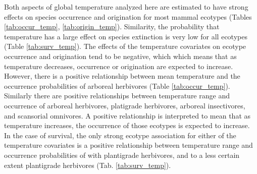 \documentclass[12pt,letterpaper]{article}
\begin{document}
Both aspects of global temperature analyzed here are estimated to have strong effects on species occurrence and origination for most mammal ecotypes (Tables \ref{tab:occur_temp}, \ref{tab:origin_temp}). Similarity, the probability that temperature has a large effect on species extinction is very low for all ecotypes (Table \ref{tab:surv_temp}). The effects of the temperature covariates on ecotype occurrence and origination tend to be negative, which which means that as temperature decreases, occurrence or origination are expected to increase. However, there is a positive relationship between mean temperature and the occurrence probabilities of arboreal herbivores (Table \ref{tab:occur_temp}). Similarly there are positive relationships between temperature range and occurrence of arboreal herbivores, platigrade herbivores, arboreal insectivores, and scansorial omnivores. A positive relationship is interpreted to mean that as temperature increases, the occurrence of those ecotypes is expected to increase. In the case of survival, the only strong ecotype association for either of the temperature covariates is a positive relationship between temperature range and occurrence probabilities of with plantigrade herbivores, and to a less certain extent plantigrade herbivores (Tab. \ref{tab:surv_temp}).
\end{document}
